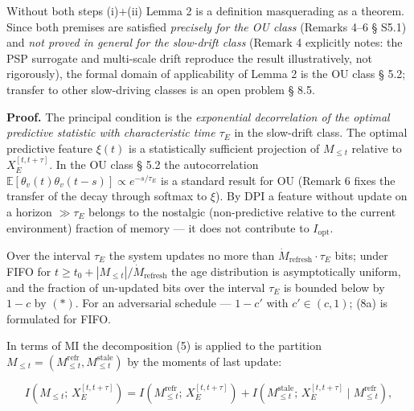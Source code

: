 \documentclass[pdflatex,sn-mathphys-ay]{sn-jnl}
\begin{document}
Without both steps (i)+(ii) Lemma 2 is a definition masquerading as a theorem. Since both premises are satisfied \emph{precisely for the OU class} (Remarks 4--6 § S5.1) and \emph{not proved in general for the slow-drift class} (Remark 4 explicitly notes: the PSP surrogate and multi-scale drift reproduce the result illustratively, not rigorously), the formal domain of applicability of Lemma 2 is the OU class § 5.2; transfer to other slow-driving classes is an open problem § 8.5.



\textbf{Proof.} The principal condition is the \emph{exponential decorrelation of the optimal predictive statistic with characteristic time \(\tau_E\)} in the slow-drift class. The optimal predictive feature \(\xi(t)\) is a statistically sufficient projection of \(M_{\le t}\) relative to \(X_E^{[t, t+\tau]}\). In the OU class § 5.2 the autocorrelation \(\mathbb{E}[\theta_v(t)\theta_v(t-s)] \propto e^{-s/\tau_E}\) is a standard result for OU (Remark 6 fixes the transfer of the decay through softmax to \(\xi\)). By DPI a feature without update on a horizon \(\gg \tau_E\) belongs to the nostalgic (non-predictive relative to the current environment) fraction of memory --- it does not contribute to \(I_{\text{opt}}\).



Over the interval \(\tau_E\) the system updates no more than \(\dot{M}_{\text{refresh}} \cdot \tau_E\) bits; under FIFO for \(t \ge t_0 + |M_{\le t}|/\dot{M}_{\text{refresh}}\) the age distribution is asymptotically uniform, and the fraction of un-updated bits over the interval \(\tau_E\) is bounded below by \(1 - c\) by \((*)\). For an adversarial schedule --- \(1 - c'\) with \(c' \in (c, 1)\); (8a) is formulated for FIFO.



In terms of MI the decomposition (5) is applied to the partition \(M_{\le t} = (M_{\le t}^{\text{refr}}, M_{\le t}^{\text{stale}})\) by the moments of last update:



\[I(M_{\le t};\, X_E^{[t,t+\tau]}) = I(M_{\le t}^{\text{refr}};\, X_E^{[t,t+\tau]}) + I(M_{\le t}^{\text{stale}};\, X_E^{[t,t+\tau]} \mid M_{\le t}^{\text{refr}}),\]
\end{document}
